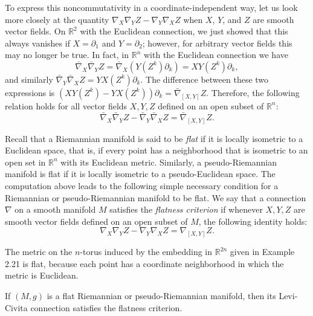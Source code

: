 To express this noncommutativity in a coordinate-independent way, let us look more closely at the quantity $\nabla_X \nabla_Y Z - \nabla_Y \nabla_X Z$ when $X$, $Y$, and $Z$ are smooth vector fields. On $\mathbb{R}^2$ with the Euclidean connection, we just showed that this always vanishes if $X = \partial_1$ and $Y = \partial_2$; however, for arbitrary vector fields this may no longer be true. In fact, in $\mathbb{R}^n$ with the Euclidean connection we have
\[
\bar{\nabla}_X \bar{\nabla}_Y Z = \bar{\nabla}_X(Y(Z^k)\partial_k) = XY(Z^k)\partial_k,
\]
and similarly $\bar{\nabla}_Y \bar{\nabla}_X Z = YX(Z^k)\partial_k$. The difference between these two expressions is $(XY(Z^k) - YX(Z^k))\partial_k = \bar{\nabla}_{[X,Y]}Z$. Therefore, the following relation holds for all vector fields $X, Y, Z$ defined on an open subset of $\mathbb{R}^n$:
\[
\bar{\nabla}_X \bar{\nabla}_Y Z - \bar{\nabla}_Y \bar{\nabla}_X Z = \bar{\nabla}_{[X,Y]}Z.
\]

Recall that a Riemannian manifold is said to be \emph{flat} if it is locally isometric to a Euclidean space, that is, if every point has a neighborhood that is isometric to an open set in $\mathbb{R}^n$ with its Euclidean metric. Similarly, a pseudo-Riemannian manifold is flat if it is locally isometric to a pseudo-Euclidean space. The computation above leads to the following simple necessary condition for a Riemannian or pseudo-Riemannian manifold to be flat. We say that a connection $\nabla$ on a smooth manifold $M$ satisfies the \emph{flatness criterion} if whenever $X, Y, Z$ are smooth vector fields defined on an open subset of $M$, the following identity holds:
\begin{equation}
\nabla_X \nabla_Y Z - \nabla_Y \nabla_X Z = \nabla_{[X,Y]}Z.
\tag{7.3}
\end{equation}

\begin{example}
\label{ex:n-torus-flat-metric}
The metric on the $n$-torus induced by the embedding in $\mathbb{R}^{2n}$ given in Example 2.21 is flat, because each point has a coordinate neighborhood in which the metric is Euclidean.
\end{example}

\begin{proposition}
\label{prop:flat-manifold-levi-civita-flatness}
If $(M,g)$ is a flat Riemannian or pseudo-Riemannian manifold, then its Levi-Civita connection satisfies the flatness criterion.
\end{proposition}

